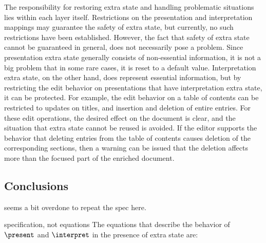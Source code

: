The responsibility for restoring extra state and handling problematic situations lies within each layer itself. Restrictions on the presentation and interpretation mappings may guarantee the safety of extra state, but currently, no such restrictions have been established. However, the fact that safety of extra state cannot be guaranteed in general, does not necessarily pose a problem. Since presentation extra state generally consists of non-essential information, it is not a big problem that in some rare cases, it is reset to a default value.  Interpretation extra state, on the other hand, does represent essential information, but by restricting the edit behavior on presentations that have interpretation extra state, it can be protected. For example, the edit behavior on a table of contents can be restricted to updates on titles, and insertion and deletion of entire entries. For these edit operations, the desired effect on the document is clear, and the situation that extra state cannot be reused is avoided. If the editor supports the behavior that deleting entries from the table of contents causes deletion of the corresponding sections, then a warning can be issued that the deletion affects more than the focused part of the enriched document. 





%																
\subsection{Conclusions}

\bc seems a bit overdone to repeat the spec here.

specification, not equations
The equations that describe the behavior of $\present$ and $\interpret$ in the presence of extra state are:

